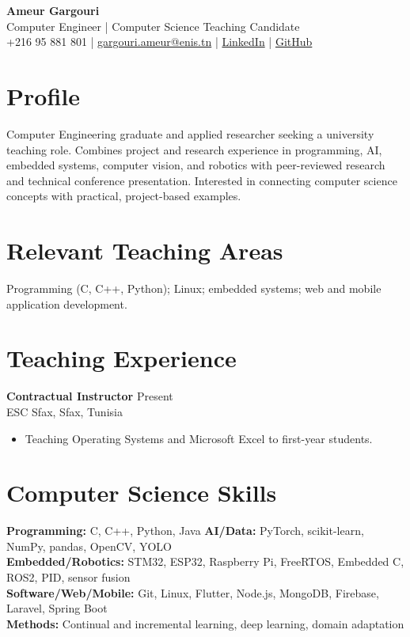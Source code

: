 \documentclass[a4paper,10pt]{article}
\begin{document}
\begin{center}
  {\Large\textbf{Ameur Gargouri}}\\[-1pt]
  Computer Engineer | Computer Science Teaching Candidate\\[2pt]
  +216 95 881 801 \quad|\quad
  \href{mailto:gargouri.ameur@enis.tn}{gargouri.ameur@enis.tn} \quad|\quad
  \href{https://www.linkedin.com/in/amer-gargouri-407744252/}{LinkedIn} \quad|\quad
  \href{https://github.com/G0AMER}{GitHub}
\end{center}
\vspace{-5pt}

\section*{Profile}
Computer Engineering graduate and applied researcher seeking a university teaching role. Combines project and research experience in programming, AI, embedded systems, computer vision, and robotics with peer-reviewed research and technical conference presentation. Interested in connecting computer science concepts with practical, project-based examples.

\section*{Relevant Teaching Areas}
Programming (C, C++, Python); Linux; embedded systems; web and mobile application development.

\section*{Teaching Experience}
\textbf{Contractual Instructor} \hfill Present\\
ESC Sfax, Sfax, Tunisia
\begin{itemize}
  \item Teaching Operating Systems and Microsoft Excel to first-year students.%
\end{itemize}

\section*{Computer Science Skills}
\textbf{Programming:} C, C++, Python, Java \quad
\textbf{AI/Data:} PyTorch, scikit-learn, NumPy, pandas, OpenCV, YOLO\\
\textbf{Embedded/Robotics:} STM32, ESP32, Raspberry Pi, FreeRTOS, Embedded C, ROS2, PID, sensor fusion\\
\textbf{Software/Web/Mobile:} Git, Linux, Flutter, Node.js, MongoDB, Firebase, Laravel, Spring Boot\\
\textbf{Methods:} Continual and incremental learning, deep learning, domain adaptation
\end{document}
